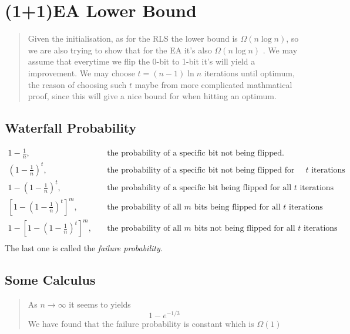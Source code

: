 \documentclass[a4paper, 12pt]{article}
\begin{document}
\section{(1+1)EA Lower Bound}
    \begin{quote}
        Given the initialisation, as for the RLS the lower bound is $\Omega(n\log n)$, so we are also trying to show that for the EA it's also $\Omega(n\log n)$
        . We may assume that everytime we flip the 0-bit to 1-bit it's will yield a improvement. We may choose $t=(n-1)\ln n$ iterations until optimum,
        the reason of choosing such $t$ maybe from more complicated mathmatical proof, since this will give a nice bound for when hitting an optimum.
    \end{quote}
    \subsection{Waterfall Probability}
        \begin{align*}
            1 - \frac{1}{n},&\quad\text{the probability of a specific bit not being flipped.}\\
            \left(1-\frac{1}{n}\right)^t,&\quad\text{the probability of a specific bit not being flipped for all } t \text{ iterations}\\
            1-\left(1-\frac{1}{n}\right)^t,&\quad\text{the probability of a specific bit being flipped for all } t \text{ iterations}\\
            \left[1-\left(1-\frac{1}{n}\right)^t\right]^m,&\quad\text{the probability of all $m$ bits being flipped for all } t \text{ iterations}\\
            1-\left[1-\left(1-\frac{1}{n}\right)^t\right]^m,&\quad\text{the probability of all $m$ bits not being flipped for all } t \text{ iterations}\\
        \end{align*}
        The last one is called the \emph{failure probability}.
    \subsection{Some Calculus}
        \begin{quote}
            As $n\rightarrow\infty$ it seems to yields
            \begin{equation*}
                1 - e^{-1/3}
            \end{equation*}
            We have found that the failure probability is constant which is $\Omega(1)$
        \end{quote}
\end{document}
